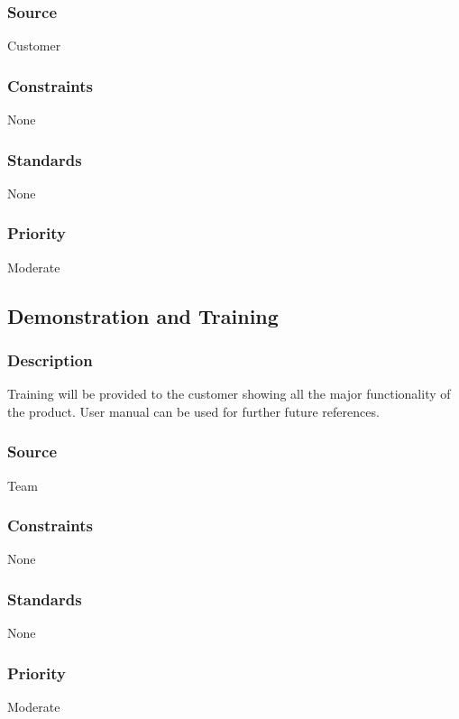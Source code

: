 \subsubsection{Source}
Customer
\subsubsection{Constraints}
None
\subsubsection{Standards}
None
\subsubsection{Priority}
Moderate

\subsection{Demonstration and Training}
\subsubsection{Description}
Training will be provided to the customer showing all the major functionality of the product. User manual can be used for further future references. 
\subsubsection{Source}
Team
\subsubsection{Constraints}
None
\subsubsection{Standards}
None
\subsubsection{Priority}
Moderate
